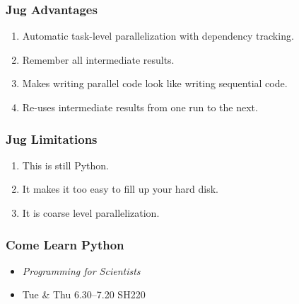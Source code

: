 \documentclass{beamer}
\begin{document}
\begin{frame}[fragile]
\frametitle{Jug Advantages}
\begin{enumerate}
\item Automatic task-level parallelization with dependency tracking.
\item Remember all intermediate results.
\pause
\item Makes writing parallel code look like writing sequential code.
\item Re-uses intermediate results from one run to the next.
\end{enumerate}
\end{frame}

\begin{frame}[fragile]
\frametitle{Jug Limitations}
\begin{enumerate}
\item This is still \alert{Python}.
\item It makes it too easy to fill up your hard disk.
\item It is coarse level parallelization.
\end{enumerate}
\end{frame}

\begin{frame}[fragile]
\frametitle{Come Learn Python}

\begin{itemize}
\item \textit{Programming for Scientists}
\item Tue \& Thu 6.30--7.20 SH220
\end{itemize}
\end{frame}
\end{document}
